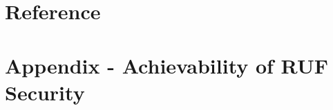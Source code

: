 

\section*{Reference}




\appendix
\backupbegin

\section{Appendix - Achievability of RUF Security}
\hypertarget{sec:appendix-RUF}{}
\label{sec:appendix-A}


\backupend


